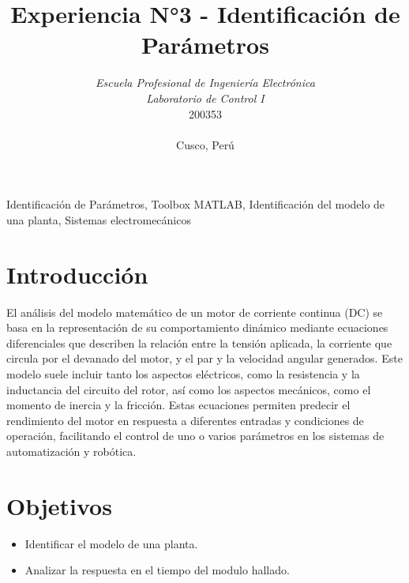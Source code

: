 \documentclass[conference]{IEEEtran}
\begin{document}
	
	\title{Experiencia N°3 - Identificación de Parámetros}
	\author{	
		\textit{Escuela Profesional de Ingeniería Electrónica}\\
		\textit{Laboratorio de Control I}\\
		200353 \\\\
		Cusco, Perú
	}
	
	\maketitle
	
	\begin{abstract}
		
	\end{abstract}
	
	\begin{IEEEkeywords}
		Identificación de Parámetros, Toolbox MATLAB, Identificación del modelo de una planta, Sistemas electromecánicos
	\end{IEEEkeywords}
	
	\section{Introducción}
		El análisis del modelo matemático de un motor de corriente continua (DC) se basa en la representación de su comportamiento dinámico mediante ecuaciones diferenciales que describen la relación entre la tensión aplicada, la corriente que circula por el devanado del motor, y el par y la velocidad angular generados. Este modelo suele incluir tanto los aspectos eléctricos, como la resistencia y la inductancia del circuito del rotor, así como los aspectos mecánicos, como el momento de inercia y la fricción. Estas ecuaciones permiten predecir el rendimiento del motor en respuesta a diferentes entradas y condiciones de operación, facilitando el control de uno o varios parámetros en los sistemas de automatización y robótica.
	\section{Objetivos}
	
	\begin{itemize}
		\item Identificar el modelo de una planta.
		\item Analizar la respuesta en el tiempo del modulo hallado.
	\end{itemize}
	
\end{document}

